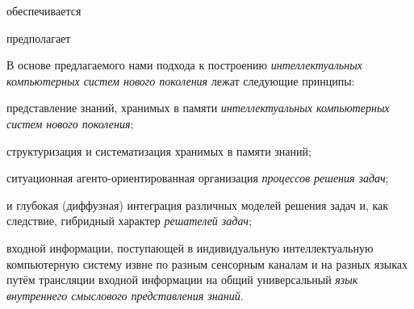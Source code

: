 \begin{SCn}
	\begin{scnrelfromlist}{обеспечивается}
	\end{scnrelfromlist}


	\begin{scnrelfromlist}{предполагает}
		\begin{scnindent}
		\end{scnindent}
	\end{scnrelfromlist}

\end{SCn}



В основе предлагаемого нами подхода к построению \textit{интеллектуальных компьютерных систем нового поколения} лежат следующие принципы:
\begin{textitemize}
	\item {} представление знаний, хранимых в памяти \textit{интеллектуальных компьютерных систем нового поколения};
	\item {} структуризация и систематизация хранимых в памяти знаний;
	\item {} ситуационная агенто-ориентированная организация \textit{процессов решения задач};
	\item {} и глубокая (диффузная) интеграция различных моделей решения задач и, как следствие, гибридный характер \textit{решателей задач};
	\item {} входной информации, поступающей в индивидуальную интеллектуальную компьютерную систему извне по разным сенсорным каналам и на разных языках путём трансляции входной информации на общий универсальный \textit{язык внутреннего смыслового представления знаний}.
\end{textitemize}

